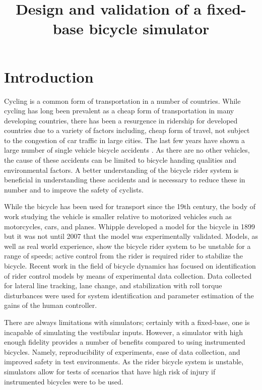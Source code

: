 \documentclass[11pt,a4paper]{amsart}
\title{Design and validation of a fixed-base bicycle simulator}
\begin{document}
\maketitle

\section{Introduction}
Cycling is a common form of transportation in a number of countries.
While cycling has long been prevalent as a cheap form of transportation in many developing countries,
there has been a resurgence in ridership for developed countries\cite{FIXME} due to a variety of factors including,
cheap form of travel, not subject to the congestion of car traffic in large cities.
The last few years have shown a large number of single vehicle bicycle accidents \cite{FIXME}.
As there are no other vehicles, the cause of these accidents can be limited to bicycle handing qualities and
environmental factors.
A better understanding of the bicycle rider system is beneficial in understanding these accidents and is necessary to
reduce these in number and to improve the safety of cyclists.

While the bicycle has been used for transport since the 19th century\cite{wilson2004}, the body of work studying the
vehicle is smaller relative to motorized vehicles such as motorcycles, cars, and planes.
Whipple developed a model for the bicycle in 1899\cite{whipple1899} but it was not until 2007 that the model was
experimentally validated\cite{kooijman2008}.
Models, as well as real world experience, show the bicycle rider system to be unstable for a range of speeds;
active control from the rider is required rider to stabilize the bicycle.
Recent work in the field of bicycle dynamics has focused on identification of rider control
models by means of experimental data collection\cite{delange2011,hess2012,hladun2015}.
Data collected for lateral line tracking\cite{delange2011,hess2012}, lane change\cite{hladun2015}, and stabilization
with roll torque disturbances\cite{delange2011,hess2012} were used for system identification and parameter estimation of
the gains of the human controller.

There are always limitations with simulators;
certainly with a fixed-base, one is incapable of simulating the vestibular inputs.
However, a simulator with high enough fidelity provides a number of benefits compared to using instrumented bicycles.
Namely, reproducibility of experiments, ease of data collection, and improved safety in test environments.
As the rider bicycle system is unstable, simulators allow for tests of scenarios that have high risk of injury if
instrumented bicycles were to be used.
\end{document}
